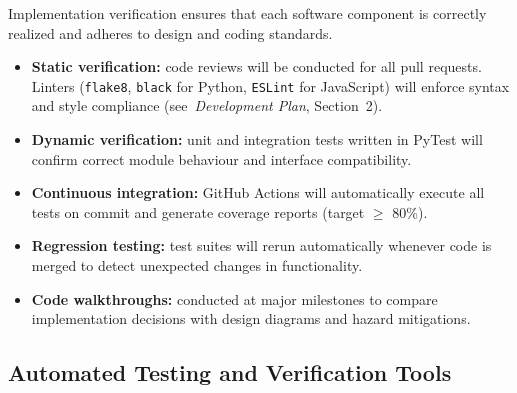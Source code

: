 \documentclass[12pt, titlepage]{article}
\begin{document}
Implementation verification ensures that each software component is correctly
realized and adheres to design and coding standards.

\begin{itemize}
  \item \textbf{Static verification:} code reviews will be conducted for all pull
  requests. Linters (\texttt{flake8}, \texttt{black} for Python, \texttt{ESLint}
  for JavaScript) will enforce syntax and style compliance
  (see~\textit{Development Plan}, Section~2).

  \item \textbf{Dynamic verification:} unit and integration tests written in
  PyTest will confirm correct module behaviour and interface compatibility.

  \item \textbf{Continuous integration:} GitHub Actions will automatically
  execute all tests on commit and generate coverage reports (target $\geq$ 80\%).

  \item \textbf{Regression testing:} test suites will rerun automatically whenever
  code is merged to detect unexpected changes in functionality.

  \item \textbf{Code walkthroughs:} conducted at major milestones to compare
  implementation decisions with design diagrams and hazard mitigations.
\end{itemize}

\subsection{Automated Testing and Verification Tools}
\label{subsec:testing-tools}
\end{document}
